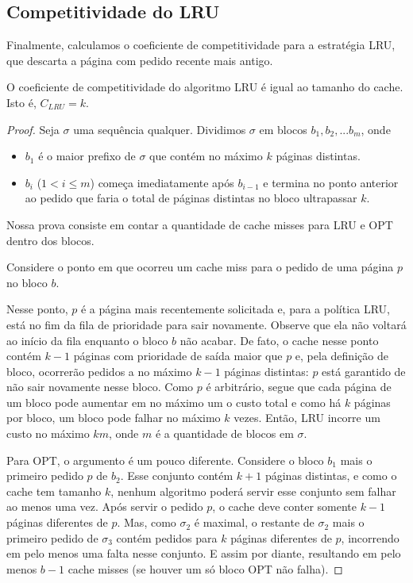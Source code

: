 \documentclass[a4paper,oneside,reqno,12pt]{amsart}
\begin{document}
\subsection{Competitividade do LRU}

Finalmente, calculamos o coeficiente de competitividade para a estratégia LRU, que descarta a página com pedido recente mais antigo.

\begin{theorem}
O coeficiente de competitividade do algoritmo LRU é igual ao tamanho do cache. Isto é, $C_{LRU} = k$.
\end{theorem}

\begin{proof}
Seja $\sigma$ uma sequência qualquer. Dividimos $\sigma$ em blocos $b_1, b_2, ... b_{m}$, onde 
\begin{itemize}
    \item $b_1$ é o maior prefixo de $\sigma$ que contém no máximo $k$ páginas distintas.
    \item $b_i$ ($1 < i \le m$) começa imediatamente após $b_{i-1}$ e termina no ponto anterior ao pedido que faria o total de páginas distintas no bloco ultrapassar $k$. 
\end{itemize}

Nossa prova consiste em contar a quantidade de cache misses para LRU e OPT dentro dos blocos.

Considere o ponto em que ocorreu um cache miss para o pedido de uma página $p$ no bloco $b$.

Nesse ponto, $p$ é a página mais recentemente solicitada e, para a política LRU, está no fim da fila de prioridade para sair novamente. Observe que ela não voltará ao início da fila enquanto o bloco $b$ não acabar. De fato, o cache nesse ponto contém $k-1$ páginas com prioridade de saída maior que $p$ e, pela definição de bloco, ocorrerão pedidos a no máximo $k-1$ páginas distintas: $p$ está garantido de não sair novamente nesse bloco. Como $p$ é arbitrário, segue que cada página de um bloco pode aumentar em no máximo um o custo total e como há $k$ páginas por bloco, um bloco pode falhar no máximo $k$ vezes. Então, LRU incorre um custo no máximo $km$, onde $m$ é a quantidade de blocos em $\sigma$.

Para OPT, o argumento é um pouco diferente. Considere o bloco $b_1$ mais o primeiro pedido $p$ de $b_2$. Esse conjunto contém $k+1$ páginas distintas, e como o cache tem tamanho $k$, nenhum algoritmo poderá servir esse conjunto sem falhar ao menos uma vez. Após servir o pedido $p$, o cache deve conter somente $k-1$ páginas diferentes de $p$. Mas, como $\sigma_2$ é maximal, o restante de $\sigma_2$ mais o primeiro pedido de $\sigma_3$ contém pedidos para $k$ páginas diferentes de $p$, incorrendo em pelo menos uma falta nesse conjunto. E assim por diante, resultando em pelo menos $b - 1$ cache misses (se houver um só bloco OPT não falha).


\end{proof}
\end{document}
